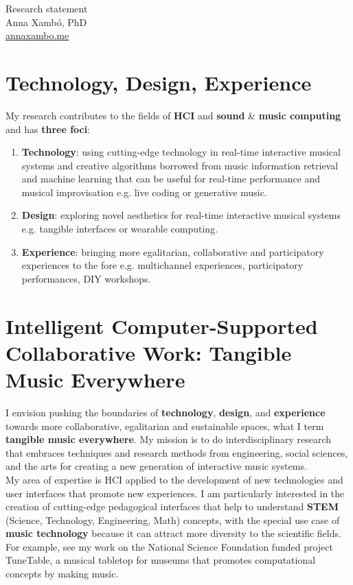 \documentclass[10pt, a4paper]{article}
\begin{document}
{\LARGE Research statement}\\[0.2cm]
Anna Xambó, PhD\\
\href{http://annaxambo.me}{annaxambo.me}

\section*{Technology, Design, Experience}

My research contributes to the fields of \textbf{HCI} and \textbf{sound} \& \textbf{music computing} and has \textbf{three foci}:

\begin{enumerate}
\item \textbf{Technology}: using cutting-edge technology in real-time interactive musical systems and creative algorithms borrowed from music information retrieval and machine learning that can be useful for real-time performance and musical improvisation e.g. live coding or generative music.
\item \textbf{Design}: exploring novel aesthetics for real-time interactive musical systems e.g. tangible interfaces or wearable computing. 
\item \textbf{Experience}: bringing more egalitarian, collaborative and participatory experiences to the fore e.g. multichannel experiences, participatory performances, DIY workshops. 
\end{enumerate}

\section*{Intelligent Computer-Supported Collaborative Work: Tangible Music Everywhere}

I envision pushing the boundaries of \textbf{technology}, \textbf{design}, and \textbf{experience} towards more collaborative, egalitarian and sustainable spaces, what I term \textbf{tangible music everywhere}. My mission is to do interdisciplinary research that embraces techniques and research methods from engineering, social sciences, and the arts for creating a new generation of interactive music systems.\\

My area of expertise is HCI applied to the development of new technologies and user interfaces that promote new experiences. I am particularly interested in the creation of cutting-edge pedagogical interfaces that help to understand \textbf{STEM} (Science, Technology, Engineering, Math) concepts, with the special use case of \textbf{music technology} because it can attract more diversity to the scientific fields. For example, see my work on the National Science Foundation funded project TuneTable, a musical tabletop for museums that promotes computational concepts by making music.\\
\end{document}
